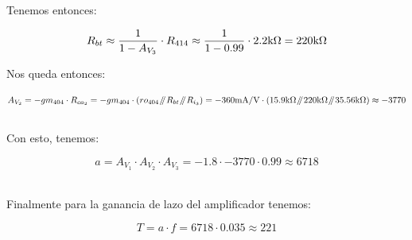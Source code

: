 \clearpage


Tenemos entonces:

\begin{equation*}
R_{bt} \approx \frac{1}{1 - A_{V_{3}}} \cdot R_{414} \approx \frac{1}{1 - 0.99} \cdot 2.2 \si[per-mode=symbol]{\kilo\ohm} = 220 \si[per-mode=symbol]{\kilo\ohm}
\end{equation*}


Nos queda entonces:

\label{calculation_of_a}

\begin{equation}
A_{V_{2}} = -gm_{404} \cdot R_{ca_{2}} = -gm_{404} \cdot \left(  r{o_{404}} \parallelresistors R_{bt} \parallelresistors R_{i_{3}}  \right) = -360 \si[per-mode=symbol]{\milli\ampere\per\volt} \cdot \left( 15.9 \si[per-mode=symbol]{\kilo\ohm} \parallelresistors 220 \si[per-mode=symbol]{\kilo\ohm} \parallelresistors 35.56 \si[per-mode=symbol]{\kilo\ohm}  \right) \approx -3770
\end{equation}\\

Con esto, tenemos:

\begin{equation}
a = A_{V_{1}} \cdot A_{V_{2}} \cdot A_{V_{3}} = -1.8 \cdot -3770 \cdot 0.99 \approx 6718
\end{equation}\\


\label{loop_gain}

Finalmente para la ganancia de lazo del amplificador tenemos:

\begin{equation}
\boxed {T = a \cdot f = 6718 \cdot 0.035 \approx 221 }
\end{equation}



\vfill

\clearpage
